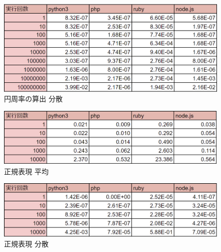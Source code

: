 \begin{figure}[tb]
    \centering
    \includegraphics[width=14.5cm,keepaspectratio]{figure/p-dispersion.PNG}
    \caption{円周率の算出 分散}
    \label{fig:p-dispersion}
\end{figure}

\clearpage

\begin{figure}[tb]
    \centering
    \includegraphics[width=14.5cm,keepaspectratio]{figure/s-average.PNG}
    \caption{正規表現 平均}
    \label{fig:s-average}
\end{figure}

\begin{figure}[tb]
    \centering
    \includegraphics[width=14.5cm,keepaspectratio]{figure/s-dispersion.PNG}
    \caption{正規表現 分散}
    \label{fig:s-dispersion}
\end{figure}
